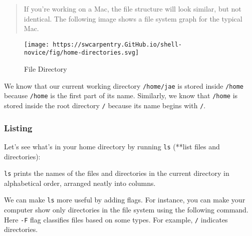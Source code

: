 \documentclass[
  letterpaper,
  DIV=11,
  numbers=noendperiod]{scrreprt}
\newenvironment{Shaded}{\begin{snugshade}}{\end{snugshade}}
\newcommand{\ExtensionTok}[1]{\textcolor[rgb]{0.00,0.23,0.31}{#1}}
\newcommand{\NormalTok}[1]{\textcolor[rgb]{0.00,0.23,0.31}{#1}}
\begin{document}
\begin{quote}
If you're working on a Mac, the file structure will look similar, but
not identical. The following image shows a file system graph for the
typical Mac.
\end{quote}

\begin{figure}

{\centering \texttt{[image: https://swcarpentry.GitHub.io/shell-novice/fig/home-directories.svg]}

}

\caption{File Directory}

\end{figure}

We know that our current working directory \texttt{/home/jae} is stored
inside \texttt{/home} because \texttt{/home} is the first part of its
name. Similarly, we know that \texttt{/home} is stored inside the root
directory \texttt{/} because its name begins with \texttt{/}.

\hypertarget{listing}{%
\subsubsection*{Listing}\label{listing}}

Let's see what's in your home directory by running \texttt{ls} (**list
files and directories):

\begin{Shaded}
\end{Shaded}

\texttt{ls} prints the names of the files and directories in the current
directory in alphabetical order, arranged neatly into columns.

We can make \texttt{ls} more useful by adding flags. For instance, you
can make your computer show only directories in the file system using
the following command. Here \texttt{-F} flag classifies files based on
some types. For example, \texttt{/} indicates directories.
\end{document}
